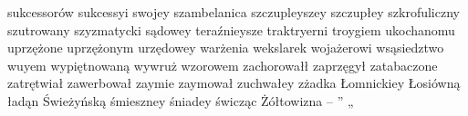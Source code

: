 \begin{itemize}
sukcessorów sukcessyi swojey szambelanica szczupleyszey szczupłey szkrofuliczny szutrowany szyzmatycki sądowey teraźnieysze traktryerni troygiem ukochanomu uprzężone uprzężonym urzędowey warżenia wekslarek wojażerowi wsąsiedztwo wuyem wypiętnowaną wywruż wzorowem zachorowałł zaprzęgył zatabaczone zatrętwiał zawerbował zaymie zaymował zuchwałey zżadka Łomnickiey Łosiówną ładąn Świeżyńską śmieszney śniadey świcząc Żółtowizna – ” „
\end{itemize}
\\
